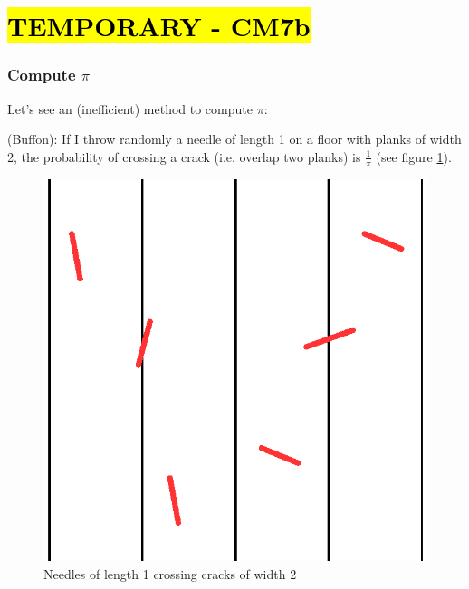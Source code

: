 \part*{\hl{TEMPORARY - CM7b}}

\section{Compute $\pi$}

Let's see an (inefficient) method to compute $\pi$:

\begin{theorem} (Buffon): If I throw randomly a needle of length 1 on a floor with planks of width 2, the probability of crossing a crack (i.e. overlap two planks) is $\frac{1}{\pi}$ (see figure \ref{needles}).
\end{theorem}


\begin{figure}[h]
\centering
\includegraphics[scale=0.7]{images/needles.eps}
\caption{Needles of length 1 crossing cracks of width 2}
\label{needles}
\end{figure}

